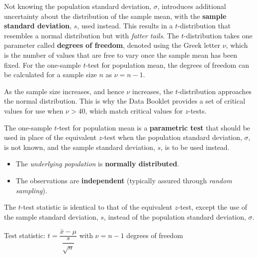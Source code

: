 \documentclass[
  11pt,
]{book}
\begin{document}
Not knowing the population standard deviation, \(\sigma\), introduces additional uncertainty about the distribution of the sample mean, with the \textbf{sample standard deviation}, \(s\), used instead. This results in a \(t\)-distribution that resembles a normal distribution but with \emph{fatter tails}. The \(t\)-distribution takes one parameter called \textbf{degrees of freedom}, denoted using the Greek letter \(\nu\), which is the number of values that are free to vary once the sample mean has been fixed. For the one-sample \(t\)-test for population mean, the degrees of freedom can be calculated for a sample size \(n\) as \(\nu=n-\text{1}\).

As the sample size increases, and hence \(\nu\) increases, the \(t\)-distribution approaches the normal distribution. This is why the Data Booklet provides a set of critical values for use when \(\nu>\text{40}\), which match critical values for \(z\)-tests.

The one-sample \(t\)-test for population mean is a \textbf{parametric test} that should be used in place of the equivalent \(z\)-test when the population standard deviation, \(\sigma\), is not known, and the sample standard deviation, \(s\), is to be used instead.

\begin{centering}
\begin{tcolorbox}[adjusted title=Conditions for the one-sample t-test for the population mean:, halign title = center,colback=red!5,colframe=red!70!black, halign = center]
\begin{itemize}
    \item The \textit{underlying population} is \textbf{normally distributed}.
    \item The observations are \textbf{independent} (typically assured through \textit{random sampling}).
\end{itemize}
\end{tcolorbox}
\end{centering}

The \(t\)-test statistic is identical to that of the equivalent \(z\)-test, except the use of the sample standard deviation, \(s\), instead of the population standard deviation, \(\sigma\).

\begin{centering}
\begin{tcolorbox}[adjusted title=For a one-sample t-test for the population mean:, halign title = center,colback=red!5,colframe=red!70!black, halign = center]
Test statistic: $t=\dfrac{\bar{x}-\mu}{\dfrac{s}{\sqrt{n}}}$ \; with $\nu=n-\text{1}$ degrees of freedom
\end{tcolorbox}
\end{centering}
\end{document}
